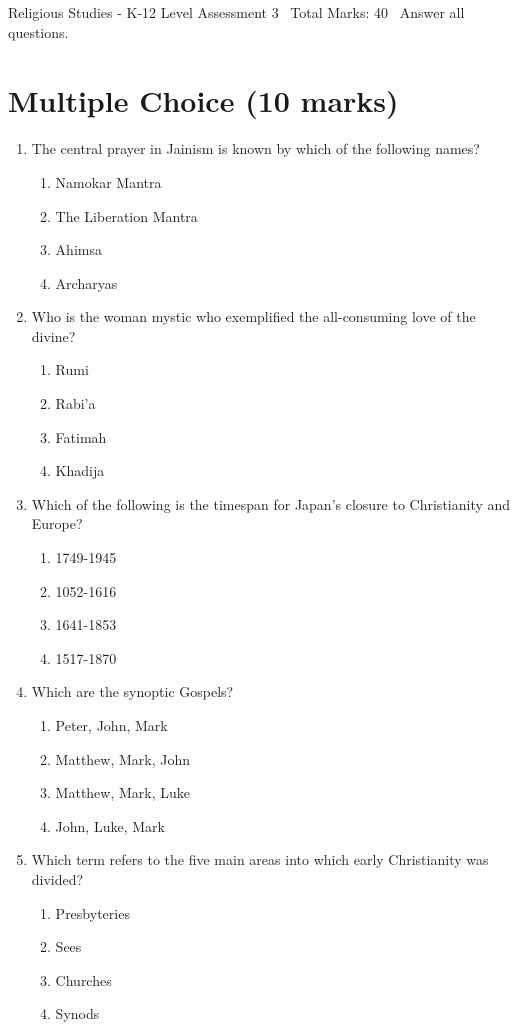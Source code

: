 \documentclass[12pt]{article}
\begin{document}
\begin{center}
Religious Studies - K-12 Level Assessment 3 \
Total Marks: 40 \
Answer all questions.
\end{center}

\section*{Multiple Choice (10 marks)}
\begin{enumerate}[label=\arabic*.]
\item The central prayer in Jainism is known by which of the following names?
\begin{enumerate}[label=(\alph*)]
    \item Namokar Mantra
    \item The Liberation Mantra
    \item Ahimsa
    \item Archaryas
\end{enumerate}
\item Who is the woman mystic who exemplified the all-consuming love of the divine?
\begin{enumerate}[label=(\alph*)]
    \item Rumi
    \item Rabi'a
    \item Fatimah
    \item Khadija
\end{enumerate}
\item Which of the following is the timespan for Japan's closure to Christianity and Europe?
\begin{enumerate}[label=(\alph*)]
    \item 1749-1945
    \item 1052-1616
    \item 1641-1853
    \item 1517-1870
\end{enumerate}
\item Which are the synoptic Gospels?
\begin{enumerate}[label=(\alph*)]
    \item Peter, John, Mark
    \item Matthew, Mark, John
    \item Matthew, Mark, Luke
    \item John, Luke, Mark
\end{enumerate}
\item Which term refers to the five main areas into which early Christianity was divided?
\begin{enumerate}[label=(\alph*)]
    \item Presbyteries
    \item Sees
    \item Churches
    \item Synods
\end{enumerate}
\end{enumerate}
\end{document}
